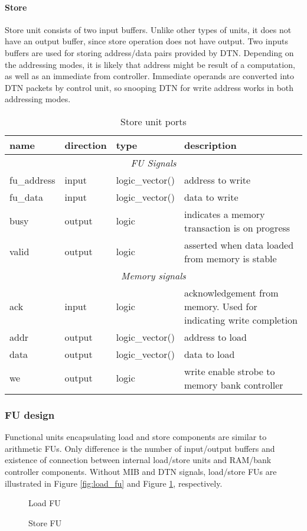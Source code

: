 	\paragraph{Store}
	Store unit consists of two input buffers. Unlike other types of units, it does not have an output buffer, since store operation does not have output. Two inputs buffers are used for storing address/data pairs provided by DTN. Depending on the addressing modes, it is likely that address might be result of a computation, as well as an immediate from controller. Immediate operands are converted into DTN packets by control unit, so snooping DTN for write address works in both addressing modes.
	\begin{table}[htbp]
		\begin{tabular}{| l| l | l | p{6cm} |}
			\hline
			\textbf{name} & \textbf{direction} & \textbf{type} &  \textbf{description}\\ \hline
			\multicolumn{4}{|c|}{\textit{FU Signals}} \\ \hline
			fu\_address & input & logic\_vector(\bankAddrL) & address to write \\ \hline
			fu\_data & input & logic\_vector(\memWordL) & data to write \\ \hline
			busy & output & logic & indicates a memory transaction is on progress \\ \hline
			valid & output & logic & asserted when data loaded from memory is stable   \\ \hline
			\multicolumn{4}{|c|}{\textit{Memory signals}} \\ \hline
			ack & input & logic & acknowledgement from memory. Used for indicating write completion \\ \hline
			addr & output & logic\_vector(\bankAddrL) & address to load \\ \hline
			data & output & logic\_vector(\memWordL) & data to load \\ \hline
			we & output & logic & write enable strobe to memory bank controller \\ \hline
		\end{tabular}
		
		\caption{Store unit ports \label{table:store_description}}
		\centering
	\end{table}
	
	
	\subsubsection{FU design}
	Functional units encapsulating load and store components are similar to arithmetic FUs. Only difference is the number of input/output buffers and existence of connection between internal load/store units and RAM/bank controller components. Without MIB and DTN signals, load/store FUs are illustrated in Figure \ref{fig:load_fu} and Figure \ref{fig:store_fu}, respectively.
		\begin{figure}[htbp]
			\centering
			\def\svgscale{0.5}
			
			\def\svgscale{0.5}
			\caption{Load FU}
			\label{fig:load_fu} 
			
			\caption{Store FU}
			\label{fig:store_fu} 
		\end{figure}